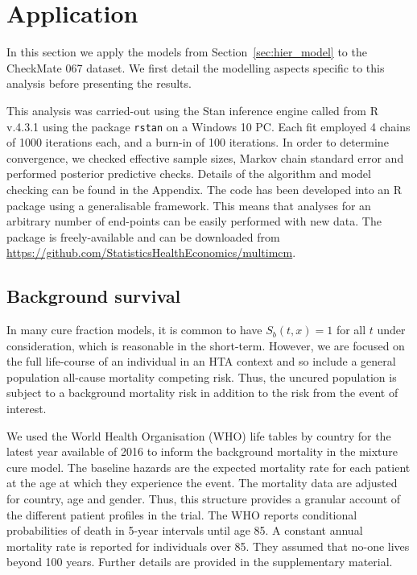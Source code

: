 \documentclass[AMA,STIX1COL]{WileyNJD-v2}
\begin{document}
%
\section{Application}\label{sec:application}
In this section we apply the models from Section~\ref{sec:hier_model} to the CheckMate 067 dataset.
We first detail the modelling aspects specific to this analysis before presenting the results.

This analysis was carried-out using the Stan inference engine \cite{carpenter2017stan} called from R v.4.3.1 \cite{Rcoreteam} using the package \texttt{rstan} on a Windows 10 PC.
Each fit employed 4 chains of 1000 iterations each, and a burn-in of 100 iterations.
In order to determine convergence, we checked effective sample sizes, Markov chain standard error and performed posterior predictive checks.
Details of the algorithm and model checking can be found in the Appendix.
The code has been developed into an R package using a generalisable framework. This means that analyses for an arbitrary number of end-points can be easily performed with new data. The package is freely-available and can be downloaded from \url{https://github.com/StatisticsHealthEconomics/multimcm}.

%
\subsection{Background survival}
In many cure fraction models, it is common to have $S_b(t, x) = 1$ for all $t$ under consideration, which is reasonable in the short-term.
However, we are focused on the full life-course of an individual in an HTA context and so include a general population all-cause mortality competing risk.
Thus, the uncured population is subject to a background mortality risk in addition to the risk from the event of interest.

We used the World Health Organisation (WHO) life tables by country for the latest year available of 2016 \cite{wholifetables} to inform the background mortality in the mixture cure model.
The baseline hazards are the expected mortality rate for each patient at the age at which they experience the event.
The mortality data are adjusted for country, age and gender. Thus, this structure provides a granular account of the different patient profiles in the trial.
The WHO reports conditional probabilities of death in 5-year intervals until age 85.
A constant annual mortality rate is reported for individuals over 85. They assumed that no-one lives beyond 100 years.
Further details are provided in the supplementary material.
\end{document}
